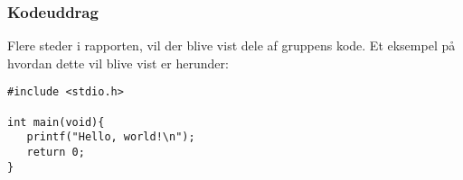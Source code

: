 \subsubsection{Kodeuddrag}
Flere steder i rapporten, vil der blive vist dele af gruppens kode. Et eksempel på hvordan dette vil blive vist er herunder:

\begin{lstlisting}[style=Cstyle, caption=Kodeeksempel i C]
#include <stdio.h>

int main(void){
   printf("Hello, world!\n");
   return 0;
}
\end{lstlisting}